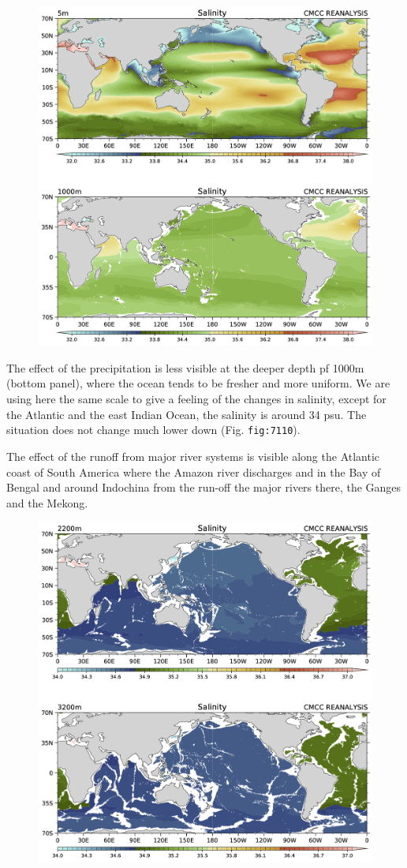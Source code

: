 \begin{figure}
\centering
\includegraphics[width = .7 \textwidth]{figs/GD/Sal5-1000.png}
\caption{} \label{fig:}
\end{figure}

The effect of the precipitation is less visible at the deeper depth pf
1000m (bottom panel), where the ocean tends to be fresher and more
uniform. We are using here the same scale to give a feeling of the
changes in salinity, except for the Atlantic and the east Indian Ocean,
the salinity is around 34 psu. The situation does not change much lower
down (Fig. \texttt{fig:7110}).

The effect of the runoff from major river systems is visible along the
Atlantic coast of South America where the Amazon river discharges and in
the Bay of Bengal and around Indochina from the run-off the major rivers
there, the Ganges and the Mekong.

\begin{figure}
\centering
\includegraphics[width = .7 \textwidth]{figs/GD/Sal2200-3200.png}
\caption{} \label{fig:}
\end{figure}

